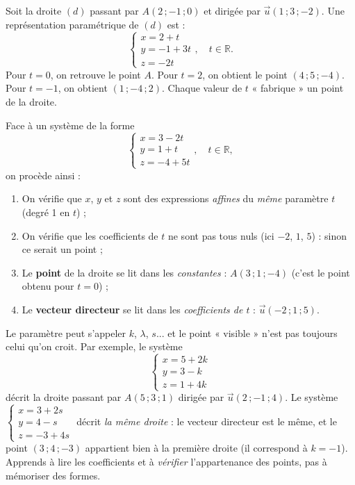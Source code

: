 \documentclass[11pt]{article}
\begin{document}
\begin{exemplebox}
Soit la droite $(d)$ passant par $A(2\,;-1\,;0)$ et dirigée par $\vec{u}(1\,;3\,;-2)$. Une représentation paramétrique de $(d)$ est :
\[ \begin{cases} x = 2 + t \\ y = -1 + 3t \\ z = -2t \end{cases}, \quad t \in \mathbb{R}. \]
Pour $t = 0$, on retrouve le point $A$. Pour $t = 2$, on obtient le point $(4\,;5\,;-4)$. Pour $t = -1$, on obtient $(1\,;-4\,;2)$. Chaque valeur de $t$ « fabrique » un point de la droite.
\end{exemplebox}

\begin{methode}
Face à un système de la forme
\[ \begin{cases} x = 3 - 2t \\ y = 1 + t \\ z = -4 + 5t \end{cases}, \quad t \in \mathbb{R}, \]
on procède ainsi :
\begin{enumerate}
\item On vérifie que $x$, $y$ et $z$ sont des expressions \emph{affines} du \emph{même} paramètre $t$ (degré 1 en $t$) ;
\item On vérifie que les coefficients de $t$ ne sont pas tous nuls (ici $-2$, $1$, $5$) : sinon ce serait un point ;
\item Le \textbf{point} de la droite se lit dans les \emph{constantes} : $A(3\,;1\,;-4)$ (c'est le point obtenu pour $t = 0$) ;
\item Le \textbf{vecteur directeur} se lit dans les \emph{coefficients de $t$} : $\vec{u}(-2\,;1\,;5)$.
\end{enumerate}
\end{methode}

\begin{attention}
Le paramètre peut s'appeler $k$, $\lambda$, $s$... et le point « visible » n'est pas toujours celui qu'on croit. Par exemple, le système
\[ \begin{cases} x = 5 + 2k \\ y = 3 - k \\ z = 1 + 4k \end{cases} \]
décrit la droite passant par $A(5\,;3\,;1)$ dirigée par $\vec{u}(2\,;-1\,;4)$. Le système $\begin{cases} x = 3 + 2s \\ y = 4 - s \\ z = -3 + 4s \end{cases}$ décrit \emph{la même droite} : le vecteur directeur est le même, et le point $(3\,;4\,;-3)$ appartient bien à la première droite (il correspond à $k = -1$). Apprends à lire les coefficients et à \emph{vérifier} l'appartenance des points, pas à mémoriser des formes.
\end{attention}
\end{document}

